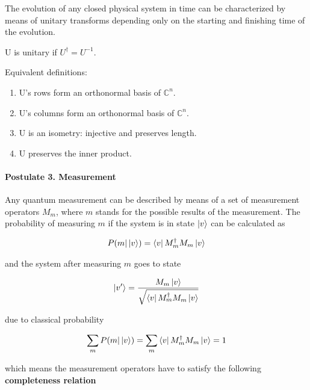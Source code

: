 The evolution of any closed physical system in time can be characterized by means of unitary transforms depending only on the starting and finishing time of the evolution.


 U is unitary if $U^{\dagger} = U^{-1}$.


Equivalent definitions:

\begin{enumerate}
    \item U's rows form an orthonormal basis of $\mathds{C}^n$.
    \item U's columns form an orthonormal basis of $\mathds{C}^n$.
    \item U is an isometry: injective and preserves length.
    \item U preserves the inner product.
\end{enumerate}

\paragraph{Postulate 3. Measurement}

Any quantum measurement can be described by means of a set of measurement operators ${M_m}$, where $m$ stands for the
possible results of the measurement. The probability of measuring $m$ if the system is in state $\ket{v}$ can be calculated as

\begin{align}
    P(m | \ket{v}) = \bra{v} M_m^{\dagger} M_m \ket{v}
\end{align}

and the system after measuring $m$ goes to state

\begin{align}
    \ket{v'} = \frac{M_m\ket{v}}{\sqrt{\bra{v} M_m^{\dagger} M_m \ket{v}}}
\end{align}

due to classical probability

\begin{align}
    \sum\limits_{m} P(m | \ket{v}) = \sum\limits_{m} \bra{v} M_m^{\dagger} M_m \ket{v} = 1
\end{align}

which means the measurement operators have to satisfy the following \textbf{completeness relation}


